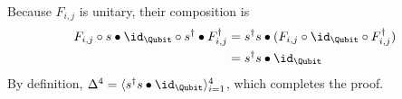 Because $F_{i,j}$ is unitary, their composition is
\begin{align*}
    F_{i,j} \circ s \bullet \id_\Qubit \circ s^\dagger \bullet F_{i,j}^\dagger 
    &= s^\dagger s \bullet(F_{i,j} \circ \id_\Qubit \circ F_{i,j}^\dagger) \\
    &= s^\dagger s \bullet \id_\Qubit
\end{align*}
By definition,
$\Delta^4 = \langle s^\dagger s \bullet \id_\Qubit \rangle_{i=1}^4$, which completes the proof.

